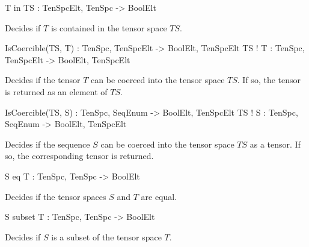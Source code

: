 \begin{intrinsics}
T in TS : TenSpcElt, TenSpc -> BoolElt
\end{intrinsics}

Decides if $T$ is contained in the tensor space $TS$.

\begin{intrinsics}
IsCoercible(TS, T) : TenSpc, TenSpcElt -> BoolElt, TenSpcElt
TS ! T : TenSpc, TenSpcElt -> BoolElt, TenSpcElt
\end{intrinsics}

Decides if the tensor $T$ can be coerced into the tensor space $TS$. If so, the tensor is returned as an element of $TS$.

\begin{intrinsics}
IsCoercible(TS, S) : TenSpc, SeqEnum -> BoolElt, TenSpcElt
TS ! S : TenSpc, SeqEnum -> BoolElt, TenSpcElt
\end{intrinsics}

Decides if the sequence $S$ can be coerced into the tensor space $TS$ as a tensor. If so, the corresponding tensor is returned. 

\begin{intrinsics}
S eq T : TenSpc, TenSpc -> BoolElt
\end{intrinsics}

Decides if the tensor spaces $S$ and $T$ are equal.

\begin{intrinsics}
S subset T : TenSpc, TenSpc -> BoolElt
\end{intrinsics}

Decides if $S$ is a subset of the tensor space $T$.

